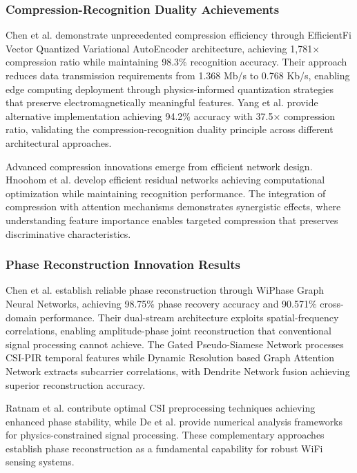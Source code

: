 \documentclass[journal]{IEEEtran}
\begin{document}
\subsubsection{Compression-Recognition Duality Achievements}

Chen et al. \cite{chen2024efficientfi} demonstrate unprecedented compression efficiency through EfficientFi Vector Quantized Variational AutoEncoder architecture, achieving 1,781× compression ratio while maintaining 98.3\% recognition accuracy. Their approach reduces data transmission requirements from 1.368 Mb/s to 0.768 Kb/s, enabling edge computing deployment through physics-informed quantization strategies that preserve electromagnetically meaningful features. Yang et al. \cite{yang2022efficientfi} provide alternative implementation achieving 94.2\% accuracy with 37.5× compression ratio, validating the compression-recognition duality principle across different architectural approaches.

Advanced compression innovations emerge from efficient network design. Hnoohom et al. \cite{hnoohom2024efficient} develop efficient residual networks achieving computational optimization while maintaining recognition performance. The integration of compression with attention mechanisms demonstrates synergistic effects, where understanding feature importance enables targeted compression that preserves discriminative characteristics.

\subsubsection{Phase Reconstruction Innovation Results}

Chen et al. \cite{chen2024wiphase} establish reliable phase reconstruction through WiPhase Graph Neural Networks, achieving 98.75\% phase recovery accuracy and 90.571\% cross-domain performance. Their dual-stream architecture exploits spatial-frequency correlations, enabling amplitude-phase joint reconstruction that conventional signal processing cannot achieve. The Gated Pseudo-Siamese Network processes CSI-PIR temporal features while Dynamic Resolution based Graph Attention Network extracts subcarrier correlations, with Dendrite Network fusion achieving superior reconstruction accuracy.

Ratnam et al. \cite{ratnam2024optimal} contribute optimal CSI preprocessing techniques achieving enhanced phase stability, while De et al. \cite{de2024numerical} provide numerical analysis frameworks for physics-constrained signal processing. These complementary approaches establish phase reconstruction as a fundamental capability for robust WiFi sensing systems.
\end{document}
